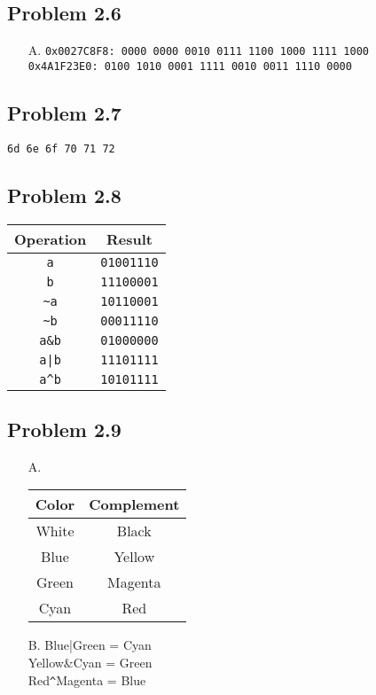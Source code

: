 \documentclass[a4paper]{article}
\begin{document}
\subsection*{Problem 2.6}
\begin{enumerate}
    \item [A.] \texttt{0x0027C8F8: 0000 0000 0010 0111 1100 1000 1111 1000}\\
               \texttt{0x4A1F23E0: 0100 1010 0001 1111 0010 0011 1110 0000}
\end{enumerate}

\subsection*{Problem 2.7}
\texttt{6d 6e 6f 70 71 72}

\subsection*{Problem 2.8}
\begin{tabular}{cc}
    Operation                    &Result\\
    \hline
    \texttt{a}                   &\texttt{01001110}\\
    \texttt{b}                   &\texttt{11100001}\\
    \texttt{\textasciitilde a}   &\texttt{10110001}\\
    \texttt{\textasciitilde b}   &\texttt{00011110}\\
    \texttt{a\&b}                &\texttt{01000000}\\
    \texttt{a|b}                 &\texttt{11101111}\\
    \texttt{a\^{}b}              &\texttt{10101111}
\end{tabular}

\subsection*{Problem 2.9}
\begin{enumerate}
    \item [A.] 
        \begin{tabular}{cc}
            Color&Complement\\
            \hline
            White   &Black\\
            Blue    &Yellow\\
            Green   &Magenta\\
            Cyan    &Red\\
        \end{tabular}
    \item [B.]  Blue|Green = Cyan\\
                Yellow\&Cyan = Green\\
                Red\texttt{\^}Magenta = Blue
\end{enumerate}
\end{document}
